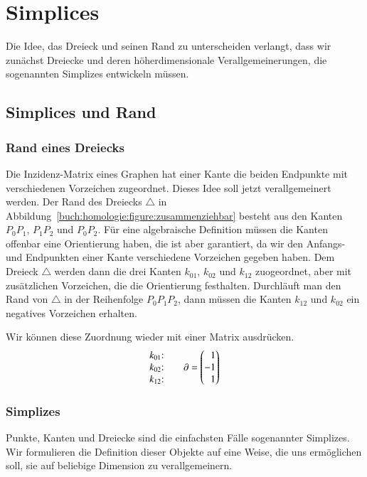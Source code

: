 %
%
%
\section{Simplices
\label{buch:section:simplexe}}
Die Idee, das Dreieck und seinen Rand zu unterscheiden verlangt,
dass wir zunächst Dreiecke und deren höherdimensionale Verallgemeinerungen,
die sogenannten Simplizes entwickeln müssen.

\subsection{Simplices und Rand
\label{buch:subsection:simplices}}

\subsubsection{Rand eines Dreiecks}
Die Inzidenz-Matrix eines Graphen hat einer Kante die beiden Endpunkte
mit verschiedenen Vorzeichen zugeordnet.
Dieses Idee soll jetzt verallgemeinert werden.
Der Rand des Dreiecks $\triangle$ in
Abbildung~\ref{buch:homologie:figure:zusammenziehbar}
besteht aus den Kanten $P_0P_1$, $P_1P_2$ und $P_0P_2$.
Für eine algebraische Definition müssen die Kanten offenbar eine
Orientierung haben, die ist aber garantiert, da wir den Anfangs-
und Endpunkten einer Kante verschiedene Vorzeichen gegeben haben.
Dem Dreieck $\triangle$ werden dann die drei Kanten $k_{01}$, $k_{02}$
und $k_{12}$ zuogeordnet, aber mit zusätzlichen Vorzeichen, die
die Orientierung festhalten.
Durchläuft man den Rand von $\triangle$ in der Reihenfolge $P_0P_1P_2$,
dann müssen die Kanten $k_{12}$ und $k_{02}$ ein negatives Vorzeichen
erhalten.

Wir können diese Zuordnung wieder mit einer Matrix ausdrücken.
\[
\begin{matrix}
\text{$k_{01}$:}\mathstrut\\
\text{$k_{02}$:}\mathstrut\\
\text{$k_{12}$:}\mathstrut
\end{matrix}
\qquad
\partial
=
\begin{pmatrix*}[r]
1\mathstrut\\
-1\mathstrut\\
1\mathstrut
\end{pmatrix*}
\]

\subsubsection{Simplizes}
Punkte, Kanten und Dreiecke sind die einfachsten Fälle sogenannter
Simplizes.
Wir formulieren die Definition dieser Objekte auf eine Weise,
die uns ermöglichen soll, sie auf beliebige Dimension zu verallgemeinern.

